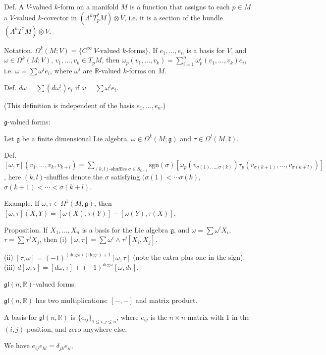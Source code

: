 \documentclass{article}
\theoremstyle{mystyle}
\theoremstyle{remark}
\numberwithin{equation}{section}
\begin{document}
Def. A $V$-valued $k$-form on a manifold $M$ is a function that assigns to each $p\in M$ a $V$-valued $k$-covector in $(\Lambda^kT^*_pM)\otimes V$, i.e. it is a section of the bundle $(\Lambda^kT^*M)\otimes V$. 

Notation. $\Omega^k(M;V) = \{C^\infty~V\text{-valued }k\text{-forms}\}$. If $e_1,...,e_n$ is a basis for $V$, and $\omega \in \Omega^k(M;V)$, $v_1,...,v_k \in T_pM$, 
then $\omega_p(v_1,...,v_k)
= \sum_{i=1}^n \omega^i_p(v_1,...,v_k)e_i$, i.e. $\omega = \sum \omega^ie_i$, where $\omega^i$ are $\mathbb{R}$-valued $k$-forms on $M$. 

Def. $d\omega = \sum (d\omega^i)e_i$ if $\omega = \sum \omega^ie_i$. 

(This definition is independent of the basis $e_1,...,e_n$.)

$\mathfrak{g}$-valued forms:

Let $\mathfrak{g}$ be a finite dimensional Lie algebra, $\omega \in \Omega^k(M;\mathfrak{g})$ and $\tau \in \Omega^l(M,\mathfrak{k})$. 

Def. $[\omega,\tau ] (v_1,...,v_k,v_{k+l})
=\sum_{(k,l)\text{-shuffles }\sigma \in S_{k+l}}
 \text{sgn} (\sigma)
 \left[\omega_p(v_{\sigma(1),...,\sigma(k)})
 \tau_p(v_{\sigma(k+1)},...,v_{\sigma(k+l)})\right]$,
here $(k,l)$-shuffles denote the $\sigma$ satisfying $(\sigma(1)<\cdots \sigma(k)$, $\sigma(k+1)<\cdots < \sigma(k+l)$. 

Example. If $\omega,\tau \in \Omega^1(M,\mathfrak{g})$, then $[\omega,\tau](X,Y) = 
[\omega(X),\tau(Y)]
-[\omega(Y),\tau(X)]$. 
 
Proposition. If $X_1,...,X_n$ is a basis for the Lie algebra $\mathfrak{g}$, and $\omega = \sum \omega^iX_i$, $\tau = \sum \tau^j X_j$, then (i) $[\omega,\tau]  = \sum\omega^i\wedge \tau^j[X_i,X_j]$. 

(ii) $[\tau,\omega]  = (-1)^{(\text{deg}\omega)(\text{deg}\tau)+1} [\omega,\tau]$ (note the extra plus one in the sign). (iii) $d[\omega,\tau] = [d\omega,\tau] + (-1)^{\text{deg}\omega} [\omega,d\tau]$. 

$\mathfrak{gl}(n,\mathbb{R})$-valued forms:


$\mathfrak{gl}(n,\mathbb{R})$ has two multiplications: $[-,-]$ and matrix product. 

A basis for $\mathfrak{gl}(n,\mathbb{R})$ is $\{e_{ij}\}_{1\leq i,j\leq n}$, where $e_{ij}$ is the $n\times n$ matrix with $1$ in the $(i,j)$ position, and zero anywhere else.

We have $e_{ij}e_{hl} = \delta_{jk}e_{il}$, 
\end{document}
